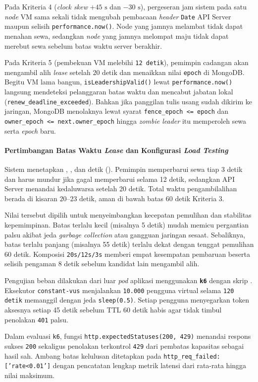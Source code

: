 Pada Kriteria 4 (\textit{clock skew} $+45\text{ s}$ dan $-30\text{ s}$), pergeseran jam sistem pada satu \textit{node} VM sama sekali tidak mengubah pembacaan \textit{header} \texttt{Date} API Server maupun selisih \texttt{performance.now()}. Node yang jamnya melambat tidak dapat menahan sewa, sedangkan \textit{node} yang jamnya melompat maju tidak dapat merebut sewa sebelum batas waktu server berakhir.

Pada Kriteria 5 (pembekuan VM melebihi \texttt{12 detik}), pemimpin cadangan akan mengambil alih \textit{lease} setelah $20\text{ detik}$ dan menaikkan nilai \texttt{epoch} di MongoDB. Begitu VM lama bangun, \texttt{isLeadershipValid()} lewat \texttt{performance.now()} langsung mendeteksi pelanggaran batas waktu dan mencabut jabatan lokal (\texttt{renew\_deadline\_exceeded}). Bahkan jika panggilan tulis usang sudah dikirim ke jaringan, MongoDB menolaknya lewat syarat \texttt{fence\_epoch <= epoch} dan \texttt{owner\_epoch <= next.owner\_epoch} hingga \textit{zombie leader} itu memperoleh sewa serta \textit{epoch} baru.

\paragraph*{Pertimbangan Batas Waktu \textit{Lease} dan Konfigurasi \textit{Load Testing}}
Sistem menetapkan , , dan  detik (). Pemimpin memperbarui sewa tiap 3 detik dan harus mundur jika gagal memperbarui selama 12 detik, sedangkan API Server menandai kedaluwarsa setelah 20 detik. Total waktu pengambilalihan berada di kisaran $20$--$23\text{ detik}$, aman di bawah batas 60 detik Kriteria 3.

Nilai tersebut dipilih untuk menyeimbangkan kecepatan pemulihan dan stabilitas kepemimpinan. Batas terlalu kecil (misalnya 5 detik) mudah memicu pergantian palsu akibat jeda \textit{garbage collection} atau gangguan jaringan sesaat. Sebaliknya, batas terlalu panjang (misalnya 55 detik) terlalu dekat dengan tenggat pemulihan 60 detik. Komposisi \texttt{20s/12s/3s} memberi empat kesempatan pembaruan beserta selisih pengaman 8 detik sebelum kandidat lain mengambil alih.

Pengujian beban dilakukan dari luar \textit{pod} aplikasi menggunakan \textbf{\texttt{k6}} dengan skrip . Eksekutor \texttt{constant-vus} menjalankan \texttt{10.000} pengguna virtual selama \texttt{120 detik} memanggil  dengan jeda \texttt{sleep(0.5)}. Setiap pengguna menyegarkan token aksesnya setiap 45 detik sebelum TTL 60 detik habis agar tidak timbul penolakan \texttt{401} palsu.

Dalam evaluasi \texttt{k6}, fungsi \texttt{http.expectedStatuses(200, 429)} menandai respons sukses \texttt{200} sekaligus penolakan terkontrol \texttt{429} dari pembatas kapasitas sebagai hasil sah. Ambang batas kelulusan ditetapkan pada \texttt{http\_req\_failed: ['rate<0.01']} dengan pencatatan lengkap metrik latensi dari rata-rata hingga nilai maksimum.
